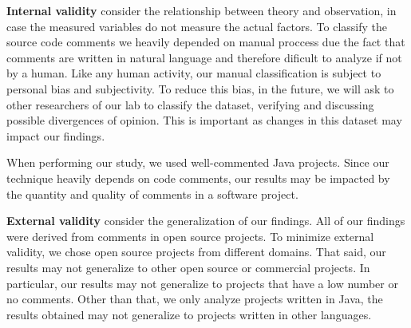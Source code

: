 \noindent\textbf{Internal validity} consider the relationship between theory and observation, in case the measured variables do not measure the actual factors. To classify the source code comments we heavily depended on manual proccess due the fact that comments are written in natural language and therefore dificult to analyze if not by a human. Like any human activity, our manual classification is subject to personal bias and subjectivity. To reduce this bias, in the future, we will ask to other researchers of our lab to classify the dataset, verifying and discussing possible divergences of opinion. This is important as changes in this dataset may impact our findings. 

When performing our study, we used well-commented Java projects. Since our technique heavily depends on code comments, our results may be impacted by the quantity and quality of comments in a software project.  

\noindent \textbf{External validity} consider the generalization of our findings. All of our findings were derived from comments in open source projects. To minimize external validity, we chose open source projects from different domains. That said, our results may not generalize to other open source or commercial projects. In particular, our results may not generalize to projects that have a low number or no comments. Other than that, we only analyze projects written in Java, the results obtained may not generalize to projects written in other languages.